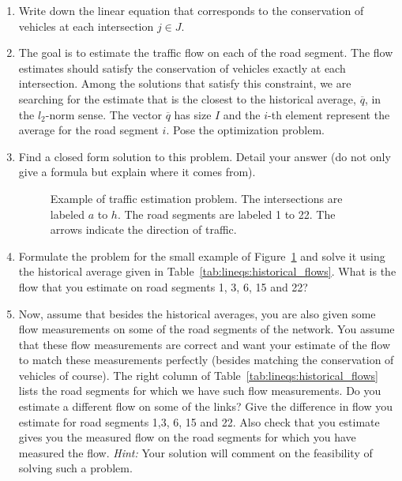 \documentclass[11pt]{article}
\begin{document}
\begin{enumerate}
\item Write down the linear equation that corresponds to the conservation of vehicles at each intersection $j\in J$.

\item The goal is to estimate the traffic flow on each of the road segment. The flow estimates should satisfy the conservation of vehicles exactly at each intersection. Among the solutions that satisfy this constraint, we are searching for the estimate that is the closest to the historical average, $\overline{q}$, in the $l_2$-norm sense. The vector $\overline{q}$ has size $I$ and the $i$-th element represent the average for the road segment $i$. Pose the optimization problem.

\item Find a closed form solution to this problem. Detail your answer (do not only give a formula but explain where it comes from).

\begin{figure}[!ht]
\centering
\caption{Example of traffic estimation problem. The intersections are labeled $a$ to $h$. The road segments are labeled 1 to 22. The arrows indicate the direction of traffic.}
\label{fig:flows}
\end{figure}
\item Formulate the problem for the small example of Figure~\ref{fig:flows} and solve it using the historical average given in Table~\ref{tab:lineqs:historical_flows}. What is the flow that you estimate on road segments 1, 3, 6, 15 and 22?

\item Now, assume that besides the historical averages, you are also given some flow measurements on some of the road segments of the network. You assume that these flow measurements are correct and want your estimate of the flow to match these measurements perfectly (besides matching the conservation of vehicles of course). The right column of
Table~\ref{tab:lineqs:historical_flows}
lists the road segments for which we have such flow measurements. Do you estimate a different flow on some of the links? Give the difference in flow you estimate for road segments 1,3, 6, 15 and 22. Also check that you estimate gives you the measured flow on the road segments for which you have measured the flow. {\em Hint:} Your solution will comment on the feasibility of solving such a problem.

\end{enumerate}
\end{document}
